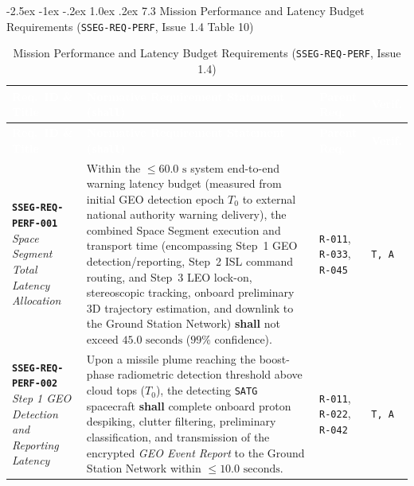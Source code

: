 \documentclass[11pt,a4paper]{article}
\makeatletter
\renewcommand\subsection{\@startsection{subsection}{2}{\z@}%
    {-2.5ex \@plus -1ex \@minus -.2ex}%
    {1.0ex \@plus .2ex}%
    {\normalfont\large\bfseries\sffamily\color{SubHeadingBlue}}}
\newcommand{\thead}[1]{\textcolor{white}{\textbf{\textsf{#1}}}}
\providecommand{\abbr}[1]{#1}
\makeatother
\begin{document}
\subsection{7.3 Mission Performance and Latency Budget Requirements (\texttt{SSEG-REQ-PERF}, Issue 1.4 Table 10)}

{\footnotesize\setlength{\tabcolsep}{4pt}\renewcommand{\arraystretch}{1.15}%
%
%
\setlength{\LTcapwidth}{\textwidth}%
\begin{longtable}{|>{\raggedright\arraybackslash}p{}|>{\raggedright\arraybackslash}p{}|>{\raggedright\arraybackslash}p{}|>{\raggedright\arraybackslash}p{}|}
\caption{Mission Performance and Latency Budget Requirements (\texttt{SSEG-REQ-PERF}, Issue 1.4)}\label{tab:req_perf_i14}\\
\hline
\rowcolor{TableHeaderBlue}
\thead{Req.\ ID \& Title} & \thead{Normative Requirement Statement (\texttt{shall})} & \thead{Parent Req.} & \thead{Verif.} \\ \hline
\endfirsthead
\hline
\rowcolor{TableHeaderBlue}
\thead{Req.\ ID \& Title} & \thead{Normative Requirement Statement (\texttt{shall})} & \thead{Parent Req.} & \thead{Verif.} \\ \hline
\endhead
\endfoot
\endlastfoot
\textbf{\texttt{SSEG-REQ-PERF-001}} \newline \emph{Space Segment Total Latency Allocation} & Within the $\le 60.0\text{ s}$ system end-to-end warning latency budget (measured from initial \abbr{GEO} detection epoch $T_0$ to external national authority warning delivery), the combined Space Segment execution and transport time (encompassing Step~1 \abbr{GEO} detection/reporting, Step~2 \abbr{ISL} command routing, and Step~3 \abbr{LEO} lock-on, stereoscopic tracking, onboard preliminary 3D trajectory estimation, and downlink to the Ground Station Network) \textbf{shall} not exceed $45.0\text{ seconds}$ ($99\%$ confidence). & \texttt{R-011}, \texttt{R-033}, \texttt{R-045} & \texttt{T, A} \\ \hline
\textbf{\texttt{SSEG-REQ-PERF-002}} \newline \emph{Step 1 GEO Detection and Reporting Latency} & Upon a missile plume reaching the boost-phase radiometric detection threshold above cloud tops ($T_0$), the detecting \texttt{SATG} spacecraft \textbf{shall} complete onboard proton despiking, clutter filtering, preliminary classification, and transmission of the encrypted \emph{GEO Event Report} to the Ground Station Network within $\le 10.0\text{ seconds}$. & \texttt{R-011}, \texttt{R-022}, \texttt{R-042} & \texttt{T, A} \\ \hline

\end{longtable}}
\end{document}

